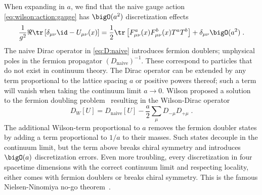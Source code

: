 When expanding in $a$, we find that the naive gauge action \cref{eq:wilson:action:gauge} has $\bigO(a^{2})$ discretization effects
\begin{equation}
\frac{1}{g^2} \Re \tr \left[ \delta_{\mu \nu} \id - U_{\mu \nu}(x) \right] = \frac{1}{2} \tr\left[ F_{\mu \nu}^{a}(x) F_{\mu \nu}^{b}(x) T^{a} T^{b} \right] + \delta_{\mu \nu} \bigO(a^{2}) \;.
\end{equation}
The naive Dirac operator in \cref{eq:D:naive} introduces fermion doublers; unphysical poles in the fermion propagator $(D_{\text{naive}})^{-1}$.
These correspond to particles that do not exist in continuum theory.
The Dirac operator can be extended by any term proportional to the lattice spacing $a$ or positive powers thereof; such a term will vanish when taking the continuum limit $a \to 0$.
Wilson proposed a solution to the fermion doubling problem~\cite{PhysRevD.25.2649} resulting in the Wilson-Dirac operator
\begin{equation} \label{eq:dirac:wilson}
D_W[U] = D_{\text{naive}}[U] - \frac{a}{2} \sum_{\mu} D_{-\mu} D_{+\mu} \;.
\end{equation}
The additional Wilson-term proportional to $a$ removes the fermion doubler states by adding a term proportional to $1/a$ to their masses.
Such states decouple in the continuum limit, but the term above breaks chiral symmetry and introduces $\bigO(a)$ discretization errors.
Even more troubling, every discretization in four spacetime dimensions with the correct continuum limit and respecting locality, either comes with fermion doublers or breaks chiral symmetry.
This is the famous Nielsen-Ninomiya no-go theorem~\cite{Nielsen:1980rz,Nielsen:1981xu}.

